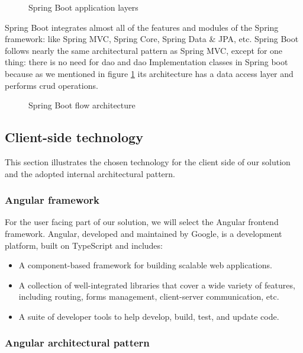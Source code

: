 \begin{figure}[hbt!]
      \centering
      
      \caption{Spring Boot application layers}
      \label{layers}
\end{figure}

Spring Boot integrates almost all of the features and modules of the Spring framework: like Spring MVC,
Spring Core, Spring Data \& JPA, etc. Spring Boot follows nearly the same architectural pattern as
Spring MVC, except for one thing: there is no need for \acrfull{dao} and \acrshort{dao} Implementation
classes in Spring boot because as we mentioned in figure \ref{layers} its architecture has a data access
layer and performs \acrshort{crud} operations.

\begin{figure}[hbt!]
      \centering
      
      \caption{Spring Boot flow architecture}
      \label{flow}
\end{figure}


\subsection{Client-side technology}
This section illustrates the chosen technology for the client side of our solution and the adopted
internal architectural pattern.

\subsubsection{Angular framework}
For the user facing part of our solution, we will select the Angular frontend framework.
Angular, developed and maintained by Google, is a development platform, built on TypeScript and
includes:
\begin{itemize}
      \item A component-based framework for building scalable web applications.
      \item A collection of well-integrated libraries that cover a wide variety of features,
            including routing, forms management, client-server communication, etc.
      \item A suite of developer tools to help develop, build, test, and update code. \cite{angular}
\end{itemize}
\raggedbottom

\subsubsection{Angular architectural pattern}

